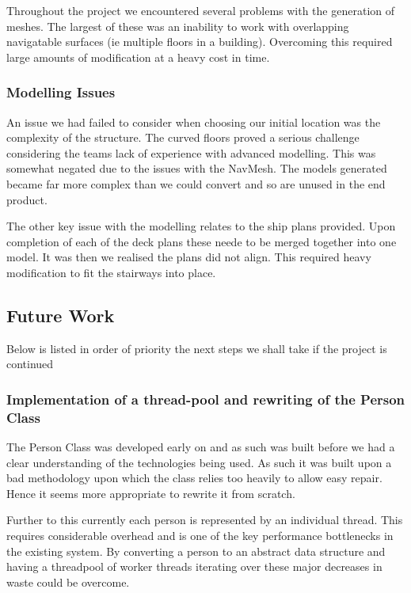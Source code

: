 Throughout the project we encountered several problems with the generation
of meshes. The largest of these was an inability to work with overlapping
navigatable surfaces (ie multiple floors in a building). Overcoming
this required large amounts of modification at a heavy cost in time.


\subsubsection*{Modelling Issues}

An issue we had failed to consider when choosing our initial location
was the complexity of the structure. The curved floors proved a serious
challenge considering the teams lack of experience with advanced modelling.
This was somewhat negated due to the issues with the NavMesh. The
models generated became far more complex than we could convert and
so are unused in the end product.

The other key issue with the modelling relates to the ship plans provided.
Upon completion of each of the deck plans these neede to be merged
together into one model. It was then we realised the plans did not
align. This required heavy modification to fit the stairways into
place.


\subsection{Future Work}

Below is listed in order of priority the next steps we shall take
if the project is continued


\subsubsection*{Implementation of a thread-pool and rewriting of the Person Class}

The Person Class was developed early on and as such was built before
we had a clear understanding of the technologies being used. As such
it was built upon a bad methodology upon which the class relies too
heavily to allow easy repair. Hence it seems more appropriate to rewrite
it from scratch.

Further to this currently each person is represented by an individual
thread. This requires considerable overhead and is one of the key
performance bottlenecks in the existing system. By converting a person
to an abstract data structure and having a threadpool of worker threads
iterating over these major decreases in waste could be overcome.


